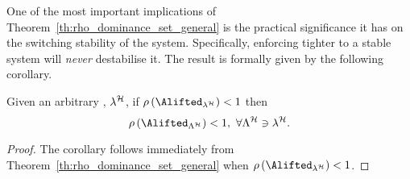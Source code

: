 One of the most important implications of Theorem~\ref{th:rho_dominance_set_general} is the practical significance it has on the switching stability of the system.
Specifically, enforcing tighter \ewhc{} to a stable system will \emph{never} destabilise it.
The result is formally given by the following corollary.
\begin{corollary}%
    \label{cor:rho_dominance_set}%
    Given an arbitrary \ewhc{}, $\lambda^{\mathcal{H}}$, if $\rho \left( \Alifted_{\lambda^\strat} \right) < 1$ then
    $$\rho\left(\Alifted_{\Lambda^\strat}\right) < 1 ,\,\, \forall \Lambda^\strat \ni \lambda^\strat. $$

    \begin{proof}
        The corollary follows immediately from Theorem~\ref{th:rho_dominance_set_general} when $\rho \left( \Alifted_{\lambda^\strat} \right) < 1$.
    \end{proof}
\end{corollary}

